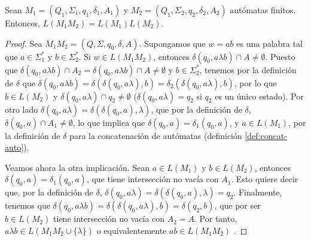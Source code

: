 \begin{proposicion} Sean $M_1=(Q_1,\Sigma_1,q_1,\delta_1,A_1)$ y $M_2=(Q_1,\Sigma_2,q_2,\delta_2,A_2)$ autómatas
finitos. Entonces, $L(M_1M_2)=L(M_1)L(M_2)$.\label{prop:concat-auto}
\end{proposicion}
\begin{proof}
Sea $M_1M_2=(Q,\Sigma,q_0,\delta,A)$. Supongamos que $w=ab$ es una palabra tal que $a\in\Sigma_1^*$ y $b\in\Sigma_2^*$.
Si $w\in L(M_1M_2)$, entonces $\delta(q_0,a\lambda b)\cap A\neq\emptyset$. Puesto que 
$\delta(q_0,a\lambda b)\cap A_2=\delta(q_0,a\lambda b)\cap A\neq\emptyset$ y $b\in\Sigma_2^*$, tenemos por la 
definición de $\delta$ que $\delta(q_0,a\lambda b)=\delta(\delta(q_0,a\lambda),b)=\delta_2(\delta(q_0,a\lambda),b)$,
por lo que $b\in L(M_2)$ y $\delta(q_0,a\lambda)\cap q_2\neq\emptyset$ ($\delta(q_0,a\lambda)=q_2$ si $q_2$ es un
único estado). Por otro lado $\delta(q_0,a\lambda)=\delta(\delta(q_0,a),\lambda)$, que por la definición de $\delta$,
$\delta(q_0,a)\cap A_1\neq\emptyset$, lo que implica que $\delta(q_0,a)=\delta_1(q_0,a)$, y $a\in L(M_1)$, por la
definición de $\delta$ para la concatenación de autómatas (definición \ref{def:concat-auto}).

Veamos ahora la otra implicación. Sean $a\in L(M_1)$ y $b\in L(M_2)$, entonces $\delta(q_0,a)=\delta_1(q_0,a)$, que 
tiene intersección no vacía con $A_1$. Esto quiere decir que, por la definición de $\delta$, 
$\delta(q_0,a\lambda)=\delta(\delta(q_0,a),\lambda)=q_2$. Finalmente, tenemos que 
$\delta(q_0,a\lambda b)=\delta(\delta(q_0,a\lambda),b)=\delta(q_2,b)$, que por ser $b\in L(M_2)$ tiene intersección
no vacía con $A_2=A$. Por tanto, $a\lambda b\in L(M_1M_2\cup\{\lambda\})$ o equivalentemente $ab\in L(M_1M_2)$
\cite{juxt_auto}.
\end{proof}

